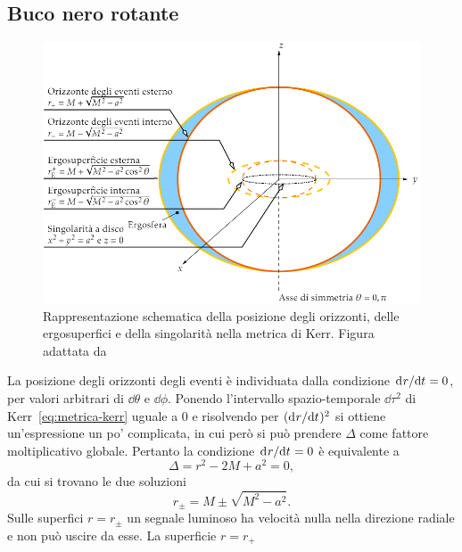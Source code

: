 \subsection{Buco nero rotante}
\label{sec:orizzonte-kerr}

\begin{figure}
  \centering
  \includegraphics[width=\textwidth]{figure/kerr}
  \caption[Rappresentazione schematica della posizione degli orizzonti, delle
  ergosuperfici e della singolarità nella metrica di Kerr]{Rappresentazione
    schematica della posizione degli orizzonti, delle ergosuperfici e della
    singolarità nella metrica di Kerr.  Figura adattata
    da~\textcite{2007arXiv0706.0622V}}
  \label{fig:geometria-kerr}
\end{figure}
La posizione degli orizzonti degli eventi è individuata dalla condizione
\(\mathrm{d}^{}r / \mathrm{d} {t}^{} = 0\), per valori arbitrari di \(\dd\theta\) e \(\dd\phi\).
Ponendo l'intervallo spazio-temporale \(\dd\tau^{2}\) di
Kerr~\eqref{eq:metrica-kerr} uguale a \(0\) e risolvendo per
\((\mathrm{d}^{}r / \mathrm{d} {t}^{})^{2}\) si ottiene un'espressione un po' complicata, in cui però
si può prendere \(\Delta\) come fattore moltiplicativo globale.  Pertanto la
condizione \(\mathrm{d}^{}r / \mathrm{d} {t}^{} = 0\) è equivalente a
\begin{equation}
  \Delta = r^{2} - 2M + a^{2} = 0,
\end{equation}
da cui si trovano le due soluzioni
\begin{equation}
  r_{\pm} = M \pm \sqrt{M^{2} - a^{2}}.
\end{equation}
Sulle superfici \(r = r_{\pm}\) un segnale luminoso ha velocità nulla nella
direzione radiale e non può uscire da esse.  La superficie \(r = r_{+}\)
